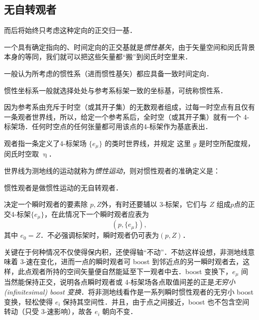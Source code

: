 
\subsection{无自转观者}



    而后将始终只考虑这种定向的正交归一基．

一个具有确定指向的、时间定向的正交基就是\textit{惯性基矢}，由于矢量空间和闵氏背景本身的等同，我们就可以把这些矢量都“搬”到闵氏时空里来．

一般认为所考虑的惯性系（进而惯性基矢）都应具备一致时间定向．
    


惯性坐标系一般就选择处处与参考系标架一致的坐标基，可统称惯性系．

因为参考系由充斥于时空（或其开子集）的无数观者组成，过每一时空点有且仅有一条观者世界线，所以，给定一个参考系后，全时空（或其开子集）就有一个 4-标架场．任何时空点的任何张量都可用该点的4-标架作为基底表出．
\begin{definition}[观者]
    观者指一条定义了4-标架场 $\{e_\mu\}$ 的类时世界线，并规定
    这里 $g$ 是时空所配度规，闵氏时空取 $\upeta$．
\end{definition}
世界线为测地线的运动就称为\textit{惯性运动}，则对惯性观者的准确定义是：
\begin{definition}[惯性观者]
    惯性观者是做惯性运动的无自转观者．
\end{definition}

决定一个瞬时观者的要素除 $p,Z$外，有时还要辅以 3-标架，它们与 $Z$ 组成$p$点的正交4-标架$\{e_\mu\}$，在此情况下一个瞬时观者应表为
\[(p,\{e_\mu\}),\]
其中 $e_0=Z$．不必强调标架时，瞬时观者仍可表为$(p,Z)$．










关键在于何种情况不仅使得保内积，还使得轴“不动”．不妨这样设想，非测地线意味着 3-速在变化，进而一点的瞬时观者可 boost 到邻近点的另一瞬时观者去，这样，此点观者所持的空间矢量便自然能延至下一观者中去．boost 变换下，$e_\mu$ 间当然能保持正交，说明各点瞬时观者或 4-标架场各点取值间差的正是\textit{无穷小(infinitesimal) boost 变换}．将非测地线看作是一系列瞬时惯性观者的无穷小 boost 变换，轻松使得 $e_i$ 保持其空间性．并且，由于点之间接近，boost 也不包含空间转动（只受 3-速影响），故各 $e_i$ 朝向不变．


